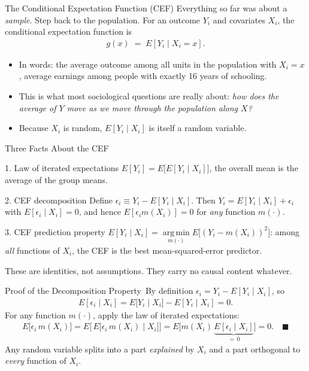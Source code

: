 \documentclass[aspectratio=169,11pt,xcolor=dvipsnames]{beamer}
\DeclareMathOperator*{\argminop}{arg\,min}
\newcommand{\argmin}{\argminop\limits}
\newcommand{\E}{E}
\newcommand{\adv}{\,\raisebox{0.6pt}{\textcolor{accent}{$\bigstar$}}}
\begin{document}
\begin{frame}{The Conditional Expectation Function (CEF)}
Everything so far was about a \emph{sample}. Step back to the population.
\vskip4pt
For an outcome $Y_i$ and covariates $X_i$, the \alert{conditional expectation
function} is
\begin{align*}
  g(x) \;=\; \E[Y_i \mid X_i = x] .
\end{align*}
\begin{itemize}\itemsep4pt
  \item In words: the average outcome among all units in the population with
        $X_i = x$, average earnings among people with exactly 16 years of
        schooling.
  \item This is what most sociological questions are really about: \emph{how does
        the average of $Y$ move as we move through the population along $X$?}
  \item Because $X_i$ is random, $\E[Y_i\mid X_i]$ is itself a random variable.
\end{itemize}
\end{frame}

\begin{frame}{Three Facts About the CEF}
\begin{block}{1. Law of iterated expectations}
$\E[Y_i] = \E\big[\E[Y_i\mid X_i]\big]$, the overall mean is the average of
the group means.
\end{block}
\pause
\begin{block}{2. CEF decomposition}
Define $\epsilon_i \equiv Y_i - \E[Y_i\mid X_i]$. Then $Y_i = \E[Y_i\mid X_i] + \epsilon_i$
with $\E[\epsilon_i\mid X_i] = 0$, and hence $\E[\epsilon_i m(X_i)] = 0$ for
\emph{any} function $m(\cdot)$.
\end{block}
\pause
\begin{block}{3. CEF prediction property}
$\E[Y_i\mid X_i] = \argmin_{m(\cdot)} \E\big[(Y_i - m(X_i))^2\big]$: among
\emph{all} functions of $X_i$, the CEF is the best mean-squared-error predictor.
\end{block}
\vskip2pt
\alert{These are identities, not assumptions.} They carry no causal content
whatever.
\end{frame}

\begin{frame}{Proof of the Decomposition Property\adv}
By definition $\epsilon_i = Y_i - \E[Y_i\mid X_i]$, so
\begin{align*}
  \E[\epsilon_i \mid X_i]
  = \E\big[Y_i \mid X_i\big] - \E[Y_i\mid X_i] = 0 .
\end{align*}
For any function $m(\cdot)$, apply the law of iterated expectations:
\begin{align*}
  \E\big[\epsilon_i\, m(X_i)\big]
  = \E\Big[\, \E\big[\epsilon_i\, m(X_i) \mid X_i \big] \Big]
  = \E\Big[ m(X_i)\, \underbrace{\E[\epsilon_i \mid X_i]}_{=\,0} \Big]
  = 0 . \quad\blacksquare
\end{align*}
\vskip4pt
Any random variable splits into a part \emph{explained} by $X_i$ and a part
orthogonal to \emph{every} function of $X_i$.
\end{frame}
\end{document}
